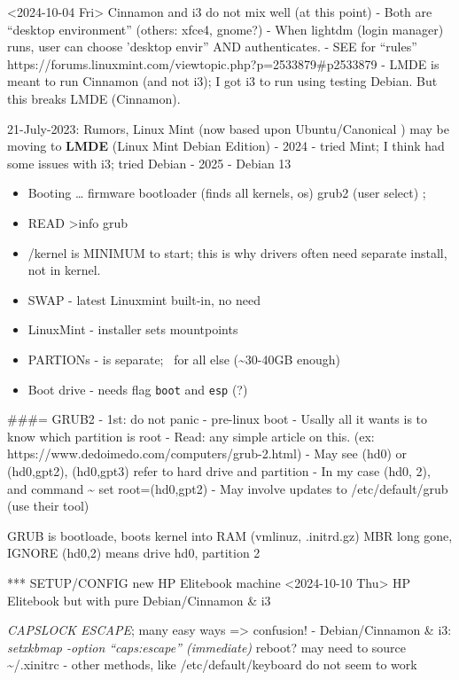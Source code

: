 \documentclass[
  letterpaper,
  DIV=11,
  numbers=noendperiod]{scrartcl}
\begin{document}
\textless2024-10-04 Fri\textgreater{} Cinnamon and i3 do not mix well
(at this point) - Both are ``desktop environment'' (others: xfce4,
gnome?) - When lightdm (login manager) runs, user can choose 'desktop
envir'' AND authenticates. - SEE for ``rules''
https://forums.linuxmint.com/viewtopic.php?p=2533879\#p2533879 - LMDE is
meant to run Cinnamon (and not i3); I got i3 to run using testing
Debian. But this breaks LMDE (Cinnamon).

21-July-2023: Rumors, Linux Mint (now based upon Ubuntu/Canonical ) may
be moving to \textbf{LMDE} (Linux Mint Debian Edition) - 2024 - tried
Mint; I think had some issues with i3; tried Debian - 2025 - Debian 13

\begin{itemize}
\item
  Booting \ldots{} firmware \textbar{} bootloader (finds all kernels,
  os) \textbar{} grub2 (user select) ;\\
\item
  READ \textgreater info grub
\item
  /kernel is MINIMUM to start; this is why drivers often need separate
  install, not in kernel.
\item
  SWAP - latest Linuxmint built-in, no need
\item
  LinuxMint - installer sets mountpoints
\item
  PARTIONs - \home is separate; ~for all else (\textasciitilde30-40GB
  enough)
\item
  Boot drive - needs flag \texttt{boot} and \texttt{esp} (?)
\end{itemize}

\#\#\#= GRUB2 - 1st: do not panic - pre-linux boot - Usally all it wants
is to know which partition is root - Read: any simple article on this.
(ex: https://www.dedoimedo.com/computers/grub-2.html) - May see (hd0) or
(hd0,gpt2), (hd0,gpt3) refer to hard drive and partition - In my case
(hd0, 2), and command \textasciitilde{} set root=(hd0,gpt2) - May
involve updates to /etc/default/grub (use their tool)

GRUB is bootloade, boots kernel into RAM (vmlinuz, .initrd.gz) MBR long
gone, IGNORE (hd0,2) means drive hd0, partition 2

*** SETUP/CONFIG new HP Elitebook machine \textless2024-10-10
Thu\textgreater{} HP Elitebook but with pure Debian/Cinnamon \& i3

\emph{CAPSLOCK ESCAPE}; many easy ways =\textgreater{} confusion! -
Debian/Cinnamon \& i3: \emph{setxkbmap -option ``caps:escape''
(immediate)} reboot? may need to source \textasciitilde/.xinitrc - other
methods, like /etc/default/keyboard do not seem to work
\end{document}
